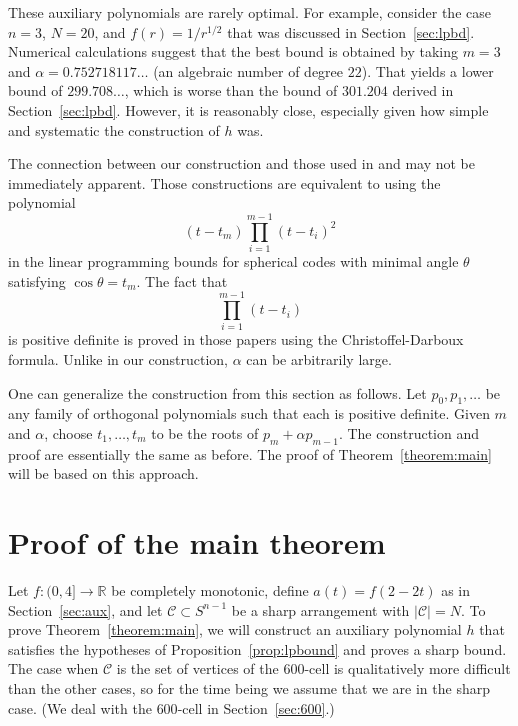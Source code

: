 \documentclass{jams-l}
\theoremstyle{plain}
\numberwithin{theorem}{section}
\theoremstyle{definition}
\numberwithin{equation}{section}
\newcommand{\R}{{\mathbb R}}
\newcommand{\CodeS}{\mathcal{C}}
\newcommand{\co}{\colon}
\begin{document}
These auxiliary polynomials are rarely optimal.  For example,
consider the case $n=3$, $N=20$, and $f(r)=1/r^{1/2}$ that was
discussed in Section~\ref{sec:lpbd}.  Numerical calculations
suggest that the best bound is obtained by taking $m=3$ and
$\alpha = 0.752718117\dots$ (an algebraic number of degree $22$).
That yields a lower bound of $299.708\dots$, which is worse than
the bound of $301.204$ derived in Section~\ref{sec:lpbd}. However,
it is reasonably close, especially given how simple and systematic
the construction of $h$ was.

The connection between our construction and those used in
\cite{MRRW} and \cite{KL} may not be immediately apparent. Those
constructions are equivalent to using the polynomial
$$
(t-t_m)\prod_{i=1}^{m-1}(t-t_i)^2
$$
in the linear programming bounds for spherical codes with minimal
angle $\theta$ satisfying $\cos \theta = t_m$.  The fact that
$$
\prod_{i=1}^{m-1}(t-t_i)
$$
is positive definite is proved in those papers using the
Christoffel-Darboux formula.  Unlike in our construction, $\alpha$
can be arbitrarily large.

One can generalize the construction from this section as follows.
Let $p_0,p_1,\dots$ be any family of orthogonal polynomials such
that each is positive definite.  Given $m$ and $\alpha$, choose
$t_1,\dots,t_m$ to be the roots of $p_m + \alpha p_{m-1}$.  The
construction and proof are essentially the same as before.  The
proof of Theorem~\ref{theorem:main} will be based on this
approach.

\section{Proof of the main theorem}
\label{sec:proof}

Let $f \co (0,4] \to \R$ be completely monotonic, define $a(t) =
f(2-2t)$ as in Section~\ref{sec:aux}, and let $\CodeS \subset
S^{n-1}$ be a sharp arrangement with $|\CodeS|=N$. To prove
Theorem~\ref{theorem:main}, we will construct an auxiliary
polynomial $h$ that satisfies the hypotheses of
Proposition~\ref{prop:lpbound} and proves a sharp bound.  The case
when $\CodeS$ is the set of vertices of the $600$-cell is
qualitatively more difficult than the other cases, so for the time
being we assume that we are in the sharp case.  (We deal with the
$600$-cell in Section~\ref{sec:600}.)
\end{document}
